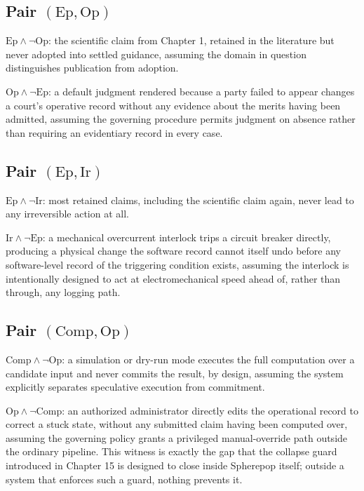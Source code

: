\documentclass[11pt,openany]{book}
\begin{document}
\subsection{Pair \texorpdfstring{\((\mathrm{Ep},\mathrm{Op})\)}{(Ep, Op)}}

\(\mathrm{Ep}\land\neg\mathrm{Op}\): the scientific claim from Chapter 1,
retained in the literature but never adopted into settled guidance, assuming
the domain in question distinguishes publication from adoption.

\(\mathrm{Op}\land\neg\mathrm{Ep}\): a default judgment rendered because a
party failed to appear changes a court's operative record without any evidence
about the merits having been admitted, assuming the governing procedure
permits judgment on absence rather than requiring an evidentiary record in
every case.

\subsection{Pair \texorpdfstring{\((\mathrm{Ep},\mathrm{Ir})\)}{(Ep, Ir)}}

\(\mathrm{Ep}\land\neg\mathrm{Ir}\): most retained claims, including the
scientific claim again, never lead to any irreversible action at all.

\(\mathrm{Ir}\land\neg\mathrm{Ep}\): a mechanical overcurrent interlock
trips a circuit breaker directly, producing a physical change the software
record cannot itself undo before any software-level record of the triggering
condition exists, assuming the interlock is intentionally designed to act at
electromechanical speed ahead of, rather than through, any logging path.

\subsection{Pair \texorpdfstring{\((\mathrm{Comp},\mathrm{Op})\)}{(Comp, Op)}}

\(\mathrm{Comp}\land\neg\mathrm{Op}\): a simulation or dry-run mode executes
the full computation over a candidate input and never commits the result, by
design, assuming the system explicitly separates speculative execution from
commitment.

\(\mathrm{Op}\land\neg\mathrm{Comp}\): an authorized administrator directly
edits the operational record to correct a stuck state, without any submitted
claim having been computed over, assuming the governing policy grants a
privileged manual-override path outside the ordinary pipeline. This witness is
exactly the gap that the collapse guard introduced in Chapter 15 is designed
to close inside Spherepop itself; outside a system that enforces such a guard,
nothing prevents it.
\end{document}
